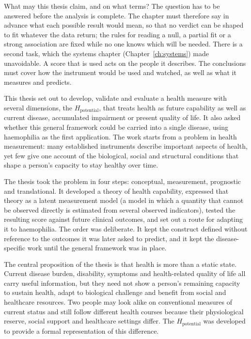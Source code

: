 \noindent What may this thesis claim, and on what terms? The question has to be
answered before the analysis is complete. The chapter must therefore say in
advance what each possible result would mean, so that no verdict can be shaped
to fit whatever the data return; the rules for reading a null, a partial fit or
a strong association are fixed while no one knows which will be needed. There is a second task, which the systems
chapter (Chapter~\ref{ch:systems}) made unavoidable. A score that is used acts
on the people it describes. The conclusions must cover how the instrument would
be used and watched, as well as what it measures and predicts.

This thesis set out to develop, validate and evaluate a health measure with several dimensions, the $H_{\text{potential}}$, that treats health as future capability as well as current disease, accumulated impairment or present quality of life. It also asked whether this general framework could be carried into a single disease, using haemophilia as the first application. The work starts from a problem in health measurement: many established instruments describe important aspects of health, yet few give one account of the biological, social and structural conditions that shape a person's capacity to stay healthy over time.

The thesis took the problem in four steps: conceptual, measurement, prognostic and translational. It developed a theory of health capability, expressed that theory as a latent measurement model (a model in which a quantity that cannot be observed directly is estimated from several observed indicators), tested the resulting score against future clinical outcomes, and set out a route for adapting it to haemophilia. The order was deliberate. It kept the construct defined without reference to the outcomes it was later asked to predict, and it kept the disease-specific work until the general framework was in place.

The central proposition of the thesis is that health is more than a static state. Current disease burden, disability, symptoms and health-related quality of life all carry useful information, but they need not show a person's remaining capacity to sustain health, adapt to biological challenge and benefit from social and healthcare resources. Two people may look alike on conventional measures of current status and still follow different health courses because their physiological reserve, social support and healthcare settings differ. The $H_{\text{potential}}$ was developed to provide a formal representation of this difference.

